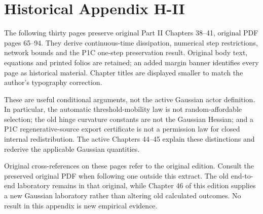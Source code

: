 \chapter*{Historical Appendix H-II}
The following thirty pages preserve original Part II Chapters 38--41,
original PDF pages 65--94. They derive continuous-time dissipation, numerical
step restrictions, network bounds and the P1C one-step preservation result.
Original body text, equations and printed folios are retained; an added
margin banner identifies every page as historical material. Chapter titles
are displayed smaller to match the author's typography correction.

These are useful conditional arguments, not the active Gaussian actor
definition. In particular, the automatic threshold-mobility law is not
random-affordable selection; the old hinge curvature constants are not the
Gaussian Hessian; and a P1C regenerative-source export certificate is not a
permission law for closed internal redistribution. The active Chapters 44--45
explain these distinctions and rederive the applicable Gaussian quantities.

Original cross-references on these pages refer to the original edition.
Consult the preserved original PDF when following one outside this extract.
The old end-to-end laboratory remains in that original, while Chapter 46 of
this edition supplies a new Gaussian laboratory rather than altering old
calculated outcomes. No result in this appendix is new empirical evidence.
